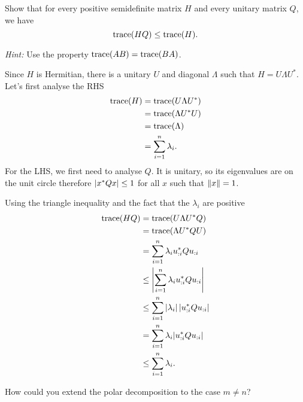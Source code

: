 Show that for every positive semidefinite matrix \(H\) and every unitary matrix \(Q\), we have
\[
\operatorname{trace}(HQ) \leq \operatorname{trace}(H).
\]

\begin{solution}
	\emph{Hint:}
	Use the property $\operatorname{trace}(AB) = \operatorname{trace}(BA)$.
	
	Since $H$ is Hermitian, there is a unitary $U$ and diagonal $\Lambda$ such that $H = U \Lambda U^*$.
	Let's first analyse the RHS
	\begin{align*}
	\operatorname{trace}(H) & = \operatorname{trace}(U \Lambda U^*)\\
	& = \operatorname{trace}(\Lambda U^*U)\\
	& = \operatorname{trace}(\Lambda)\\
	& = \sum_{i=1}^n \lambda_i.
	\end{align*}
	For the LHS, we first need to analyse $Q$.
	It is unitary, so its eigenvalues are on the unit circle therefore ${\left\lvert x^* Q x\right\lvert} \leq 1$ for all $x$ such that ${\left\lVert x\right\rVert}=1$.
	
	Using the triangle inequality and the fact that the $\lambda_i$ are positive
	\begin{align*}
	\operatorname{trace}(HQ)
	& = \operatorname{trace}(U \Lambda U^* Q)\\
	& = \operatorname{trace}(\Lambda U^* Q U)\\
	& = \sum_{i=1}^n \lambda_i u_{:i}^* Q u_{:i}\\
	& \leq {\left\lvert\sum_{i=1}^n \lambda_i u_{:i}^* Q u_{:i}\right\lvert}\\
	& \leq \sum_{i=1}^n {\left\lvert\lambda_i\right\lvert} \, {\left\lvert u_{:i}^* Q u_{:i}\right\lvert}\\
	& = \sum_{i=1}^n \lambda_i {\left\lvert u_{:i}^* Q u_{:i}\right\lvert}\\
	& \leq \sum_{i=1}^n \lambda_i.
	\end{align*}
\end{solution}

How could you extend the polar decomposition to the case \(m \neq n\)?

